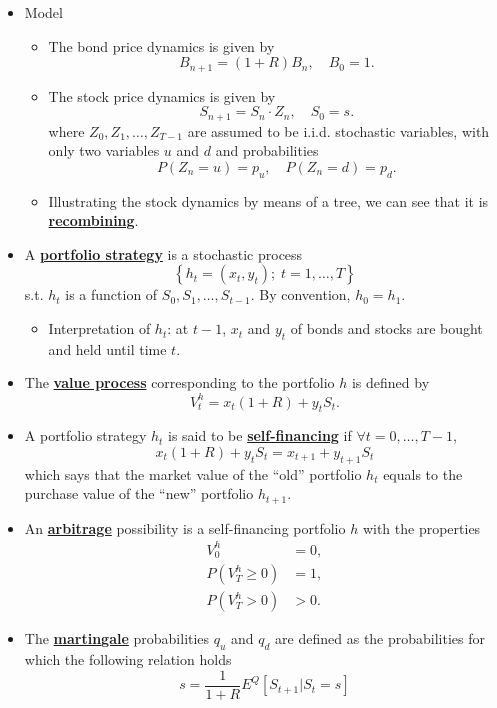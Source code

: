 \documentclass[twocolumn,landscape,10pt]{article}
\theoremstyle{definition}
\begin{document}
\begin{itemize}
    \item Model
        \begin{itemize}
            \item The bond price dynamics is given by
                \[
                    B_{n+1}=(1+R)B_n,\quad B_0=1.
                \]
            \item The stock price dynamics is given by
                \[
                    S_{n+1}=S_n\cdot Z_n,\quad S_0=s.
                \]
                where $Z_0,Z_1,\ldots,Z_{T-1}$ are assumed to be i.i.d.
                stochastic variables, with only two variables $u$ and $d$ and
                probabilities
                \[
                    P(Z_n=u)=p_u,\quad P(Z_n=d)=p_d.
                \]
            \item Illustrating the stock dynamics by means of a tree, we can see
                that it is \textbf{\underline{recombining}}.
        \end{itemize}
    \item A \textbf{\underline{portfolio strategy}} is a stochastic process
        \[
            \left\{h_t=(x_t,y_t);\;t=1,\ldots,T\right\}
        \]
        s.t. $h_t$ is a function of $S_0,S_1,\ldots,S_{t-1}$. By convention,
        $h_0=h_1$.
        \begin{itemize}
            \item Interpretation of $h_t$: at $t-1$,
                $x_t$ and $y_t$ of bonds and stocks are bought and held until time $t$.
        \end{itemize}
    \item The \textbf{\underline{value process}} corresponding to the portfolio
        $h$ is defined by
        \[
            V_t^h=x_t(1+R)+y_tS_t.
        \]
    \item A portfolio strategy $h_t$ is said to be \textbf{\underline{self-financing}} 
        if $\forall t=0,\ldots,T-1$,
        \[
            x_t(1+R)+y_tS_t = x_{t+1}+y_{t+1}S_t
        \]
        which says that the market value of the ``old'' portfolio $h_t$ 
        equals to the purchase value of the ``new'' portfolio $h_{t+1}$.
    \item An \textbf{\underline{arbitrage}} possibility is a self-financing
        portfolio $h$ with the properties
        \[
            \begin{align*}
                V_0^h &= 0, \\
                P(V_T^h\ge{}0) &= 1, \\
                P(V_T^h>0) &> 0.
            \end{align*}
        \]
    \item The \textbf{\underline{martingale}} probabilities $q_u$ and $q_d$ are
        defined as the probabilities for which the following relation holds
        \[
            s=\frac{1}{1+R}E^Q[S_{t+1}|S_t=s]
        \]
\end{itemize}
\end{document}
